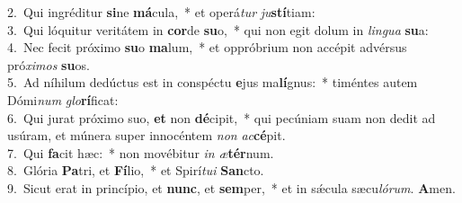 {2.~}Qui ingréditur \textbf{si}ne \textbf{má}cula,~* et operá\textit{tur} \textit{ju}\textbf{stí}tiam:\\
{3.~}Qui lóquitur veritátem in \textbf{cor}de \textbf{su}o,~* qui non egit dolum in \textit{lin}\textit{gua} \textbf{su}a:\\
{4.~}Nec fecit próximo \textbf{su}o \textbf{ma}lum,~* et oppróbrium non accépit advérsus pró\textit{xi}\textit{mos} \textbf{su}os.\\
{5.~}Ad níhilum dedúctus est in conspéctu \textbf{e}jus ma\textbf{lí}gnus:~* timéntes autem Dómi\textit{num} \textit{glo}\textbf{rí}ficat:\\
{6.~}Qui jurat próximo suo, \textbf{et} non \textbf{dé}cipit,~* qui pecúniam suam non dedit ad usúram, et múnera super innocéntem \textit{non} \textit{ac}\textbf{cé}pit.\\
{7.~}Qui \textbf{fa}cit hæc:~* non movébitur \textit{in} \textit{æ}\textbf{tér}num.\\
{8.~}Glória \textbf{Pa}tri, et \textbf{Fí}lio,~* et Spirí\textit{tu}\textit{i} \textbf{San}cto.\\
{9.~}Sicut erat in princípio, et \textbf{nunc}, et \textbf{sem}per,~* et in sǽcula sæcu\textit{ló}\textit{rum}. \textbf{A}men.\\
